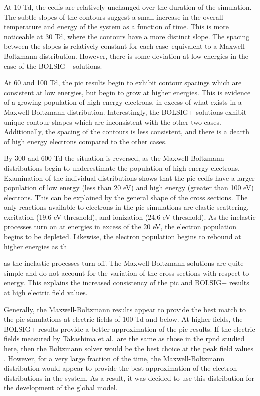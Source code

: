 At 10 Td, the \acs{eedf}s are relatively unchanged over the duration of the
simulation. The subtle slopes of the contours suggest a small increase in the
overall temperature and energy of the system as a function of time. This is more
noticeable at 30 Td, where the contours have a more distinct slope. The spacing
between the slopes is relatively constant for each case--equivalent to a
Maxwell-Boltzmann distribution. However, there is some deviation at low energies
in the case of the BOLSIG+ solutions.

At 60 and 100 Td, the \acs{pic} results begin to exhibit contour spacings which
are consistent at low energies, but begin to grow at higher energies. This is
evidence of a growing population of high-energy electrons, in excess of what
exists in a Maxwell-Boltzmann distribution. Interestingly, the BOLSIG+ solutions
exhibit unique contour shapes which are inconsistent with the other two cases.
Additionally, the spacing of the contours is less consistent, and there is a
dearth of high energy electrons compared to the other cases.

By 300 and 600 Td the situation is reversed, as the Maxwell-Boltzmann
distributions begin to underestimate the population of high energy electrons.
Examination of the individual distributions shows that the \acs{pic} \acs{eedf}s
have a larger population of low energy (less than 20 eV) and high energy
(greater than 100 eV) electrons. This can be explained by the general shape of
the cross sections. The only reactions available to electrons in the \acs{pic}
simulations are elastic scattering, excitation (19.6 eV threshold), and
ionization (24.6 eV threshold). As the inelastic processes turn on at energies
in excess of the 20 eV, the electron population begins to be depleted. Likewise,
the electron population begins to rebound at higher energies as th

as the inelastic
processes turn off. The Maxwell-Boltzmann solutions are quite simple and do not
account for the variation of the cross sections with respect to energy. This
explains the increased consistency of the \acs{pic} and BOLSIG+ results at high
electric field values.

Generally, the Maxwell-Boltzmann results appear to provide the best match to the
\acs{pic} simulations at electric fields of 100 Td and below. At higher fields,
the BOLSIG+ results provide a better approximation of the \acs{pic} results. If
the electric fields measured by Takashima et al.\ are the same as those in the
\acs{rpnd} studied here, then the Boltzmann solver would be the best choice at
the peak field values \cite{Takashima2011}. However, for a very large fraction
of the time, the Maxwell-Boltzmann distribution would appear to provide the best
approximation of the electron distributions in the system. As a result, it was
decided to use this distribution for the development of the global model.

